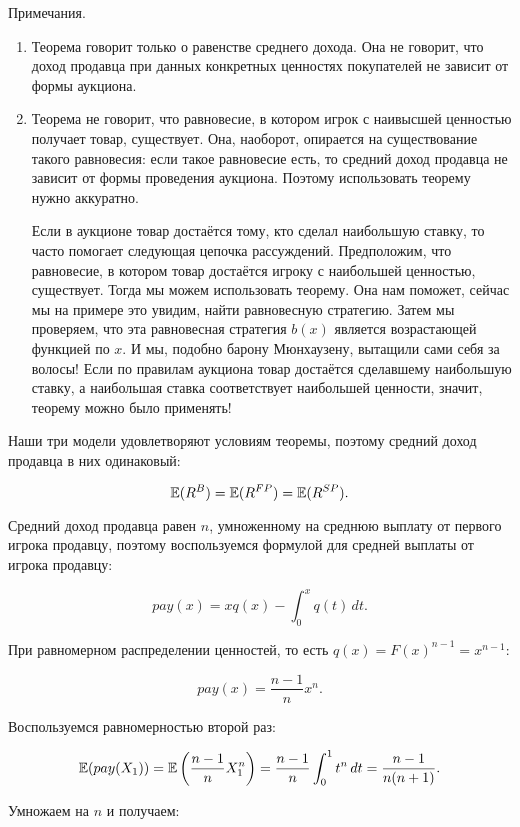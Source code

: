 Примечания.
\begin{enumerate}
\item Теорема говорит только о равенстве среднего дохода. Она не говорит, что доход продавца при данных конкретных ценностях покупателей не зависит от формы аукциона.
\item Теорема не говорит, что равновесие, в котором игрок с наивысшей ценностью получает товар, существует. Она, наоборот, опирается на существование такого равновесия: если такое равновесие есть, то средний доход продавца не зависит от формы проведения аукциона. Поэтому использовать теорему нужно аккуратно.

Если в аукционе товар достаётся тому, кто сделал наибольшую ставку, то час\-то помогает следующая цепочка рассуждений. Предположим, что равновесие, в котором товар достаётся игроку с наибольшей ценностью, существует. Тогда мы можем использовать теорему. Она нам поможет, сейчас мы на примере это увидим, найти равновесную стратегию. Затем мы проверяем, что эта равновесная стратегия $b(x)$ является возрастающей функцией по $x$. И мы, подобно барону Мюнхаузену, вытащили сами себя за волосы! Если по правилам аукциона товар достаётся сделавшему наибольшую ставку, а наибольшая ставка соответствует наибольшей ценности, значит, теорему можно было применять!
\end{enumerate}


Наши три модели удовлетворяют условиям теоремы, поэтому средний доход продавца в них одинаковый:

\[
\operatorname{\mathbb{E}}(R^{B})=\operatorname{\mathbb{E}}(R^{FP})=\operatorname{\mathbb{E}}(R^{SP}).
\]

Средний доход продавца равен $ n $, умноженному на среднюю выплату от первого игрока продавцу, поэтому воспользуемся формулой для средней выплаты от игрока продавцу:

\[
pay(x)=xq(x)-\int_{0}^{x}q(t) \, dt.
\]

При равномерном распределении ценностей, то есть $q(x)=F(x)^{n-1}=x^{n-1}$:

\begin{equation}
pay(x)=\frac{n-1}{n}x^{n}.
\end{equation}

Воспользуемся равномерностью второй раз:

\begin{equation}
\operatorname{\mathbb{E}}(pay(X_{1}))=\operatorname{\mathbb{E}}\left(\frac{n-1}{n}X_{1}^{n}\right)=\frac{n-1}{n}\int_{0}^{1} t^{n} \, dt=\frac{n-1}{n(n+1)}.
\end{equation}

Умножаем на $ n $ и получаем:


